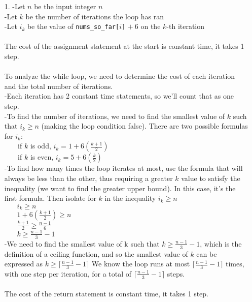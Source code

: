 \documentclass[fontsize=11pt]{article}
\begin{document}
\begin{enumerate}
\item[1.]
-Let $n$ be the input integer $n$ \\
-Let $k$ be the number of iterations the loop has ran \\
-Let $i_k$ be the value of \texttt{nums\_so\_far[$i$]} $+ ~6$ on the $k$-th iteration \\~\\

The cost of the assignment statement at the start is constant time, it takes 1 step. \\~\\

To analyze the while loop, we need to determine the cost of each iteration and the total number of iterations. \\
-Each iteration has 2 constant time statements, so we'll count that as one step. \\
-To find the number of iterations, we need to find the smallest value of $k$ such that $i_k \geq n$ (making the loop condition false). There are two possible formulas for $i_k$: \\
$~~~~~~~$ if $k$ is odd, $i_k = 1 + 6(\frac{k + 1}{2})$ \\
$~~~~~~~$ if $k$ is even, $i_k = 5 + 6(\frac{k}{2})$ \\
-To find how many times the loop iterates at most, use the formula that will always be less than the other, thus requiring a greater $k$ value to satisfy the inequality (we want to find the greater upper bound). In this case, it's the first formula. Then isolate for $k$ in the inequality $i_k \geq n$\\
$~~~~~~~~ i_k \geq n$ \\
$~~~~~~~~ 1 + 6(\frac{k + 1}{2}) \geq n$ \\
$~~~~~~~~ \frac{k + 1}{2} \geq \frac{n - 1}{6}$ \\
$~~~~~~~~ k \geq \frac{n - 1}{3} - 1$ \\
-We need to find the smallest value of k such that $k \geq \frac{n - 1}{3} - 1$, which is the definition of a ceiling function, and so the smallest value of $k$ can be expressed as $k \geq \lceil\frac{n - 1}{3} - 1\rceil$
We know the loop runs at most $\lceil\frac{n - 1}{3} - 1\rceil$ times, with one step per iteration, for a total of $\lceil\frac{n - 1}{3} - 1\rceil$ steps. \\~\\

The cost of the return statement is constant time, it takes 1 step. \\~\\


\end{enumerate}
\end{document}
